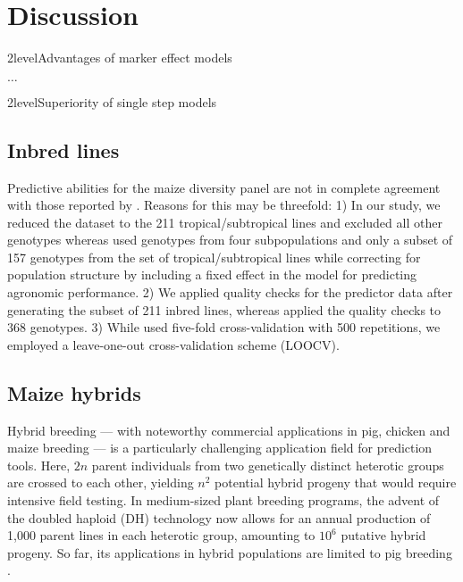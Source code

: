 \documentclass[12pt,titlepage]{article}
\begin{document}
\section*{Discussion}


\Genetics2level{Advantages of marker effect models}

$\dots$

\Genetics2level{Superiority of single step models}
\subsection{Inbred lines}
Predictive abilities for the maize diversity panel are not in complete
agreement with those reported by .
Reasons for this may be threefold: 
1) In our study, we reduced the dataset to the 211 tropical/subtropical lines 
and excluded all other genotypes whereas  used genotypes from 
four subpopulations and only a subset of 157 genotypes from the set of 
tropical/subtropical lines while correcting for population structure by
including a fixed effect in the model for predicting agronomic performance.
2) We applied quality checks for the predictor data after generating the subset
of 211 inbred lines, whereas  applied the quality checks to 368
genotypes.
3) While  used five-fold cross-validation with 500 repetitions,
we employed a leave-one-out cross-validation scheme (LOOCV).


\subsection{Maize hybrids}
Hybrid breeding --- with noteworthy commercial applications in pig, chicken and 
maize breeding --- is a particularly challenging application field for
prediction tools.
Here, $2n$ parent individuals from two genetically distinct heterotic groups are
crossed to each other, yielding $n^{2}$ potential hybrid progeny that would
require intensive field testing.
In medium-sized plant breeding programs, the advent of the doubled haploid (DH) 
technology \cite{Wedzony2009} now allows for an annual production of 1,000 
parent lines in each heterotic group, amounting to $10^{6}$ putative hybrid
progeny.
So far, its applications in hybrid populations are limited to pig breeding
\cite{Xiang2015,Xiang2016,Tusell2016}.
\end{document}
